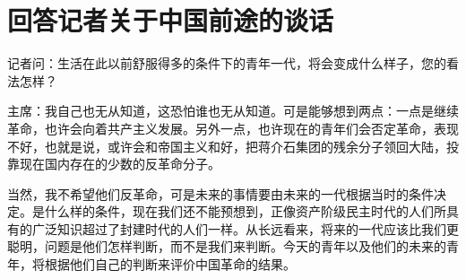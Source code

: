 \section[回答记者关于中国前途的谈话 ]{回答记者关于中国前途的谈话 }


记者问：生活在此以前舒服得多的条件下的青年一代，将会变成什么样子，您的看法怎样？

主席：我自己也无从知道，这恐怕谁也无从知道。可是能够想到两点：一点是继续革命，也许会向着共产主义发展。另外一点，也许现在的青年们会否定革命，表现不好，也就是说，或许会和帝国主义和好，把蒋介石集团的残余分子领回大陆，投靠现在国内存在的少数的反革命分子。

当然，我不希望他们反革命，可是未来的事情要由未来的一代根据当时的条件决定。是什么样的条件，现在我们还不能预想到，正像资产阶级民主时代的人们所具有的广泛知识超过了封建时代的人们一样。从长远看来，将来的一代应该比我们更聪明，问题是他们怎样判断，而不是我们来判断。今天的青年以及他们的未来的青年，将根据他们自己的判断来评价中国革命的结果。


